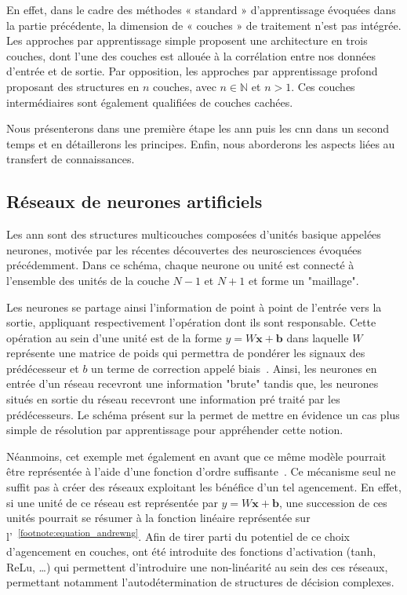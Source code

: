 En effet, dans le cadre des méthodes « standard » d’apprentissage évoquées dans la partie précédente, la dimension de « couches » de traitement n’est pas intégrée. Les approches par apprentissage simple proposent une architecture en trois couches, dont l’une des couches est allouée à la corrélation entre nos données d’entrée et de sortie. Par opposition, les approches par apprentissage profond proposant des structures en $n$ couches, avec $n \in \pmb{\mathbb{N}}$ et $n>1$. Ces couches intermédiaires sont également qualifiées de couches cachées.\par 

Nous présenterons dans une première étape les \gls{ann} puis les \gls{cnn} dans un second temps et en détaillerons les principes. Enfin, nous aborderons les aspects liées au transfert de connaissances.\par

\subsection{Réseaux de neurones artificiels}
Les \gls{ann} sont des structures multicouches composées d'unités basique appelées neurones, motivée par les récentes découvertes des neurosciences évoquées précédemment. Dans ce schéma, chaque neurone ou unité est connecté à l'ensemble des unités de la couche $N-1$ et $N+1$ et forme un "maillage".\par

Les neurones se partage ainsi l'information de point à point de l'entrée vers la sortie, appliquant respectivement l'opération dont ils sont responsable. Cette opération  au sein d'une unité est de la forme $y = W\mathbf{x}+\mathbf{b}$ dans laquelle $W$ représente une matrice de poids qui permettra de pondérer les signaux des prédécesseur et $b$ un terme de correction appelé biais~\cite{Stephen1990}. Ainsi, les neurones en entrée d'un réseau recevront une information "brute" tandis que, les neurones situés en sortie du réseau recevront une information pré traité par les prédécesseurs. Le schéma présent sur la  permet de mettre en évidence un cas plus simple de résolution par apprentissage pour appréhender cette notion.\par

Néanmoins, cet exemple met également en avant que ce même modèle pourrait être représentée à l'aide d'une fonction d'ordre suffisante~\cite{Bishop2006}. Ce mécanisme seul ne suffit pas à créer des réseaux exploitant les bénéfice d'un tel agencement. En effet, si une unité de ce réseau est représentée par $y = W\mathbf{x}+\mathbf{b}$, une succession de ces unités pourrait se résumer à la fonction linéaire représentée sur l'~\textsuperscript{\ref{footnote:equation_andrewng}}. 
Afin de tirer parti du potentiel de ce choix d'agencement en couches, ont été introduite des fonctions d'activation (tanh, ReLu, \ldots) qui permettent d'introduire une non-linéarité au sein des ces réseaux, permettant notamment l’autodétermination de structures de décision complexes.\par


